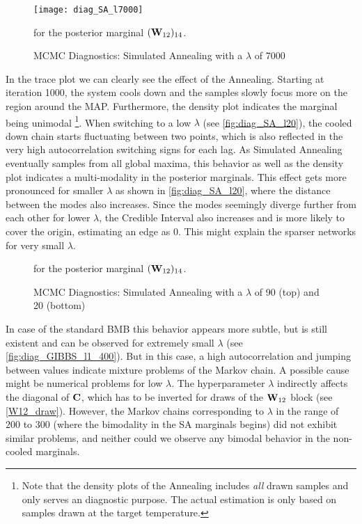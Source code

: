 \begin{figure}[H]
	\centering
	\texttt{[image: diag\_SA\_l7000]}
	\caption{MCMC Diagnostics: Simulated Annealing with a $\lambda$ of 7000}
	for the posterior marginal $(\mathbf{W}_{12})_{14}$.
	\label{fig:diag_SA_l7000}
\end{figure}
In the trace plot we can clearly see the effect of the Annealing.
Starting at iteration 1000, the system cools down and the samples slowly focus more on the region around the MAP.
Furthermore, the density plot indicates the marginal being unimodal%
\footnote{Note that the density plots of the Annealing includes \textit{all} drawn samples and only serves an diagnostic purpose.
	The actual estimation is only based on samples drawn at the target temperature.}.
When switching to a low $\lambda$ (see \autoref{fig:diag_SA_l20}), the cooled down chain starts fluctuating between two points,
which is also reflected in the very high autocorrelation switching signs for each lag.
As Simulated Annealing eventually samples from all global maxima, this behavior as well as the density plot indicates a multi-modality in the posterior marginals.
This effect gets more pronounced for smaller $\lambda$ as shown in \autoref{fig:diag_SA_l20},
where the distance between the modes also increases.
Since the modes seemingly diverge further from each other for lower $\lambda$, the Credible Interval also increases and is more likely to cover the origin, estimating an edge as 0.
This might explain the sparser networks for very small $\lambda$.

\begin{figure}
	\centering
	\caption{MCMC Diagnostics: Simulated Annealing with a $\lambda$ of 90 (top) and 20 (bottom) }
	for the posterior marginal $(\mathbf{W}_{12})_{14}$.
	\label{fig:diag_SA_l20}
\end{figure}
In case of the standard BMB this behavior appears more subtle, but is still existent and can be observed for extremely small $\lambda$ (see \autoref{fig:diag_GIBBS_l1_400}).
But in this case, a high autocorrelation and jumping between values indicate mixture problems of the Markov chain. A possible cause might be numerical problems for low $\lambda$.
The hyperparameter $\lambda$ indirectly affects the diagonal of $\mathbf{C}$, which has to be inverted for draws of the $\mathbf{W}_{12}$ block (see \autoref{W12_draw}).
However, the Markov chains corresponding to $\lambda$ in the range of $200$ to $300$ (where the bimodality in the SA marginals begins) did not exhibit similar problems, and neither could we observe any bimodal behavior in the non-cooled marginals.

